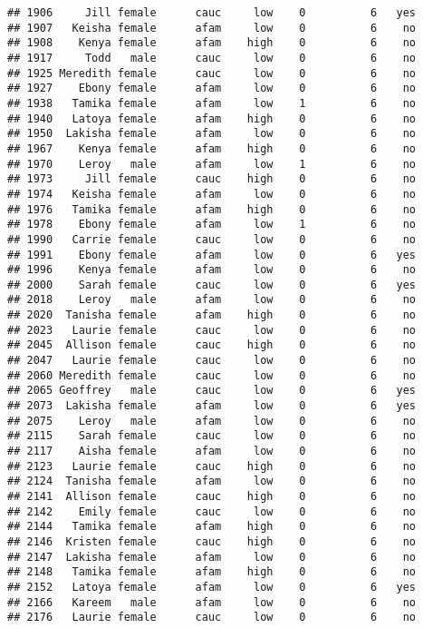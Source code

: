 \documentclass[
]{article}
\begin{document}
\begin{verbatim}
## 1906     Jill female      cauc     low    0          6   yes
## 1907   Keisha female      afam     low    0          6    no
## 1908    Kenya female      afam    high    0          6    no
## 1917     Todd   male      cauc     low    0          6    no
## 1925 Meredith female      cauc     low    0          6    no
## 1927    Ebony female      afam     low    0          6    no
## 1938   Tamika female      afam     low    1          6    no
## 1940   Latoya female      afam    high    0          6    no
## 1950  Lakisha female      afam     low    0          6    no
## 1967    Kenya female      afam    high    0          6    no
## 1970    Leroy   male      afam     low    1          6    no
## 1973     Jill female      cauc    high    0          6    no
## 1974   Keisha female      afam     low    0          6    no
## 1976   Tamika female      afam    high    0          6    no
## 1978    Ebony female      afam     low    1          6    no
## 1990   Carrie female      cauc     low    0          6    no
## 1991    Ebony female      afam     low    0          6   yes
## 1996    Kenya female      afam     low    0          6    no
## 2000    Sarah female      cauc     low    0          6   yes
## 2018    Leroy   male      afam     low    0          6    no
## 2020  Tanisha female      afam    high    0          6    no
## 2023   Laurie female      cauc     low    0          6    no
## 2045  Allison female      cauc    high    0          6    no
## 2047   Laurie female      cauc     low    0          6    no
## 2060 Meredith female      cauc     low    0          6    no
## 2065 Geoffrey   male      cauc     low    0          6   yes
## 2073  Lakisha female      afam     low    0          6   yes
## 2075    Leroy   male      afam     low    0          6    no
## 2115    Sarah female      cauc     low    0          6    no
## 2117    Aisha female      afam     low    0          6    no
## 2123   Laurie female      cauc    high    0          6    no
## 2124  Tanisha female      afam     low    0          6    no
## 2141  Allison female      cauc    high    0          6    no
## 2142    Emily female      cauc     low    0          6    no
## 2144   Tamika female      afam    high    0          6    no
## 2146  Kristen female      cauc    high    0          6    no
## 2147  Lakisha female      afam     low    0          6    no
## 2148   Tamika female      afam    high    0          6    no
## 2152   Latoya female      afam     low    0          6   yes
## 2166   Kareem   male      afam     low    0          6    no
## 2176   Laurie female      cauc     low    0          6    no

\end{verbatim}
\end{document}
